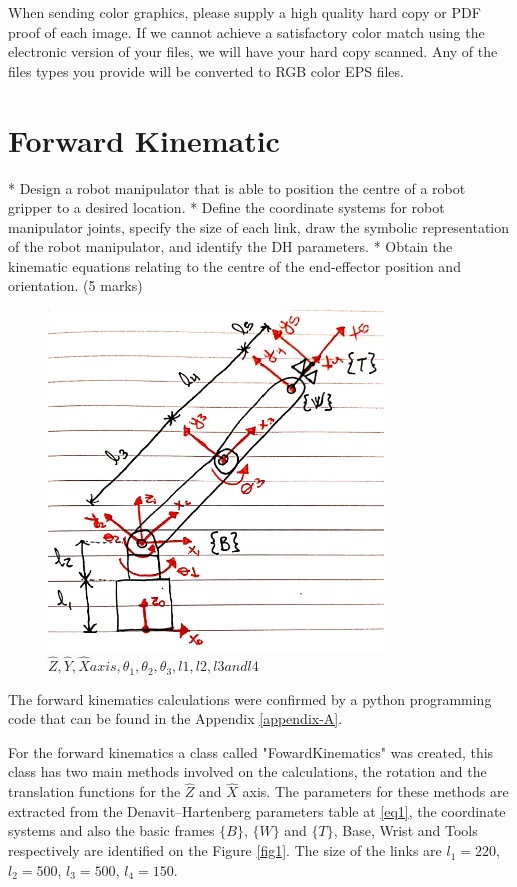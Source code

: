 \documentclass[transmag]{IEEEtran}
\begin{document}
When sending color graphics, please supply a high quality hard copy or PDF 
proof of each image. If we cannot achieve a satisfactory color match using 
the electronic version of your files, we will have your hard copy scanned. 
Any of the files types you provide will be converted to RGB color EPS files. 


\section{Forward Kinematic}
* Design a robot manipulator that is able to position the centre of a robot gripper to a desired location. 
* Define the coordinate systems for robot manipulator joints, specify the size of each link, draw the symbolic representation of the robot manipulator, and identify the DH parameters. 
* Obtain the kinematic equations relating to the centre of the end-effector position and orientation. (5 marks)

\begin{figure}
\centerline{\includegraphics[width=3.5in]{./images/Axis}}
\caption{$\hat Z, \hat Y, \hat X axis, \theta_1, \theta_2, \theta_3, l1, l2, l3 and l4 $\label{fig13}}
\end{figure}

The forward kinematics calculations were confirmed by a python programming code that can be found in the Appendix \ref{appendix-A}. 

For the forward kinematics a class called "FowardKinematics" was created, this class has two main methods involved on the calculations, the rotation and the translation functions for the $\hat Z$ and $\hat X$ axis. The parameters for these methods are extracted from the Denavit–Hartenberg parameters table at \ref{eq1}, the coordinate systems and also the basic frames $\{B\}$, $\{W\}$ and $\{T\}$, Base, Wrist and Tools respectively are identified on the Figure \ref{fig1}. The size of the links are $l_1 = 220$, $l_2 = 500$, $l_3 = 500$, $l_4 = 150$.
\end{document}
